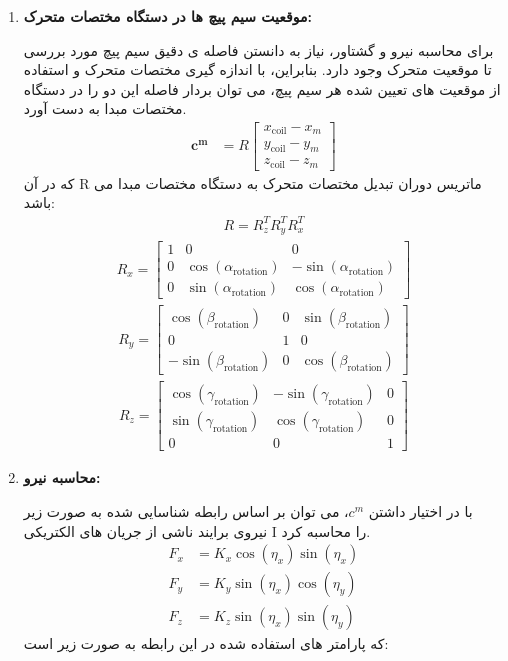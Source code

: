\begin{enumerate}
	\item\textbf{ موقعیت سیم پیچ ها در دستگاه مختصات متحرک:}
	
	برای محاسبه نیرو و گشتاور، نیاز به دانستن فاصله ی دقیق سیم پیچ مورد بررسی تا موقعیت متحرک وجود دارد. بنابراین، با اندازه گیری مختصات متحرک و استفاده از موقعیت های تعیین شده هر سیم پیچ، می توان بردار فاصله این دو را در دستگاه مختصات مبدا به دست آورد.
	\begin{align}
		\mathbf{c^{m}} &= R 
		\begin{bmatrix}
			x_{\text{coil}} - x_m \\
			y_{\text{coil}} - y_m \\
			z_{\text{coil}} - z_m
		\end{bmatrix}
	\end{align}
	که در آن R ماتریس دوران تبدیل مختصات متحرک به دستگاه مختصات مبدا می باشد:
	\begin{align}
		R = R_z^T R_y^T R_x^T
	\end{align}
	\begin{align}
		R_x =
		\begin{bmatrix}
			1 & 0 & 0 \\
			0 & \cos(\alpha_{\text{rotation}}) & -\sin(\alpha_{\text{rotation}}) \\
			0 & \sin(\alpha_{\text{rotation}}) & \cos(\alpha_{\text{rotation}})
		\end{bmatrix}
	\end{align}
	\begin{align}
		R_y =
		\begin{bmatrix}
			\cos(\beta_{\text{rotation}}) & 0 & \sin(\beta_{\text{rotation}}) \\
			0 & 1 & 0 \\
			-\sin(\beta_{\text{rotation}}) & 0 & \cos(\beta_{\text{rotation}})
		\end{bmatrix}
	\end{align}
	\begin{align}
		R_z =
		\begin{bmatrix}
			\cos(\gamma_{\text{rotation}}) & -\sin(\gamma_{\text{rotation}}) & 0 \\
			\sin(\gamma_{\text{rotation}}) & \cos(\gamma_{\text{rotation}}) & 0 \\
			0 & 0 & 1
		\end{bmatrix}
	\end{align}
	\item \textbf{محاسبه نیرو:}
	
	با در اختیار داشتن $c^{m}$، می توان بر اساس رابطه شناسایی شده به صورت زیر نیروی برایند ناشی از جریان های الکتریکی I را محاسبه کرد. 
	\begin{align}
		F_x &= K_x \cos(\eta_x) \sin(\eta_x) \\
		F_y &= K_y \sin(\eta_x) \cos(\eta_y) \\
		F_z &= K_z \sin(\eta_x) \sin(\eta_y)
	\end{align}
	که پارامتر های استفاده شده در این رابطه به صورت زیر است:
	

\end{enumerate}
